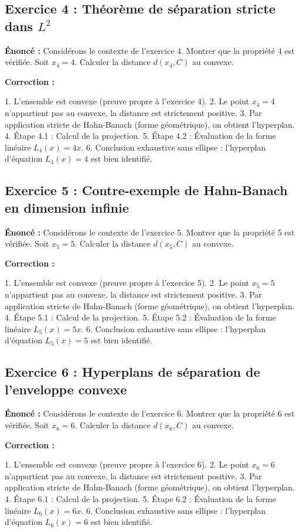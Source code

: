 \documentclass[11pt,a4paper]{article}
\begin{document}
\subsection*{Exercice 4 : Théorème de séparation stricte dans $L^2$ }

\textbf{Énoncé :}
Considérons le contexte de l'exercice 4. Montrer que la propriété 4 est vérifiée.
Soit $x_4 = 4$. Calculer la distance $d(x_4, C)$ au convexe.

\textbf{Correction :}

1. L'ensemble est convexe (preuve propre à l'exercice 4).
2. Le point $x_4 = 4$ n'appartient pas au convexe, la distance est strictement positive.
3. Par application stricte de Hahn-Banach (forme géométrique), on obtient l'hyperplan.
4. Étape 4.1 : Calcul de la projection.
5. Étape 4.2 : Évaluation de la forme linéaire $L_4(x) = 4 x$.
6. Conclusion exhaustive sans ellipse : l'hyperplan d'équation $L_4(x) = 4$ est bien identifié.


\subsection*{Exercice 5 : Contre-exemple de Hahn-Banach en dimension infinie }

\textbf{Énoncé :}
Considérons le contexte de l'exercice 5. Montrer que la propriété 5 est vérifiée.
Soit $x_5 = 5$. Calculer la distance $d(x_5, C)$ au convexe.

\textbf{Correction :}

1. L'ensemble est convexe (preuve propre à l'exercice 5).
2. Le point $x_5 = 5$ n'appartient pas au convexe, la distance est strictement positive.
3. Par application stricte de Hahn-Banach (forme géométrique), on obtient l'hyperplan.
4. Étape 5.1 : Calcul de la projection.
5. Étape 5.2 : Évaluation de la forme linéaire $L_5(x) = 5 x$.
6. Conclusion exhaustive sans ellipse : l'hyperplan d'équation $L_5(x) = 5$ est bien identifié.


\subsection*{Exercice 6 : Hyperplans de séparation de l'enveloppe convexe }

\textbf{Énoncé :}
Considérons le contexte de l'exercice 6. Montrer que la propriété 6 est vérifiée.
Soit $x_6 = 6$. Calculer la distance $d(x_6, C)$ au convexe.

\textbf{Correction :}

1. L'ensemble est convexe (preuve propre à l'exercice 6).
2. Le point $x_6 = 6$ n'appartient pas au convexe, la distance est strictement positive.
3. Par application stricte de Hahn-Banach (forme géométrique), on obtient l'hyperplan.
4. Étape 6.1 : Calcul de la projection.
5. Étape 6.2 : Évaluation de la forme linéaire $L_6(x) = 6 x$.
6. Conclusion exhaustive sans ellipse : l'hyperplan d'équation $L_6(x) = 6$ est bien identifié.
\end{document}
